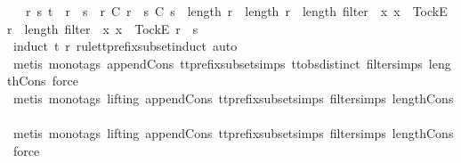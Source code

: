 \begin{isabellebody}
\ \ {\isasymexists}\ r{\isacharprime}\ s{\isacharprime}{\isachardot}\ t\ {\isacharequal}\ r{\isacharprime}\ {\isacharat}\ s{\isacharprime}\ {\isasymand}\ r{\isacharprime}\ {\isasymlesssim}\isactrlsub C\ r\ {\isasymand}\ s{\isacharprime}\ {\isasymlesssim}\isactrlsub C\ s\ {\isasymand}\ {\isacharparenleft}{\isacharparenleft}length\ r{\isacharprime}\ {\isacharequal}\ length\ r\ {\isasymand}\ length\ {\isacharparenleft}filter\ {\isacharparenleft}{\isasymlambda}\ x{\isachardot}\ x\ {\isacharequal}\ {\isacharbrackleft}Tock{\isacharbrackright}\isactrlsub E{\isacharparenright}\ r{\isacharprime}{\isacharparenright}\ {\isacharequal}\ length\ {\isacharparenleft}filter\ {\isacharparenleft}{\isasymlambda}\ x{\isachardot}\ x\ {\isacharequal}\ {\isacharbrackleft}Tock{\isacharbrackright}\isactrlsub E{\isacharparenright}\ r{\isacharparenright}{\isacharparenright}\ {\isasymor}\ s{\isacharprime}\ {\isacharequal}\ {\isacharbrackleft}{\isacharbrackright}{\isacharparenright}{\isachardoublequoteclose}\isanewline
%
\isadelimproof
\ \ %
\endisadelimproof
%
\isatagproof
{}\isamarkupfalse%
\ {\isacharparenleft}induct\ t\ {\isachardoublequoteopen}r{\isachardoublequoteclose}\ rule{\isacharcolon}tt{\isacharunderscore}prefix{\isacharunderscore}subset{\isachardot}induct{\isacharcomma}\ auto{\isacharparenright}\isanewline
\ \ \isamarkupfalse%
\ {\isacharparenleft}metis\ {\isacharparenleft}mono{\isacharunderscore}tags{\isacharparenright}\ append{\isacharunderscore}Cons\ tt{\isacharunderscore}prefix{\isacharunderscore}subset{\isachardot}simps{\isacharparenleft}{}{\isacharparenright}\ ttobs{\isachardot}distinct{\isacharparenleft}{}{\isacharparenright}\ filter{\isachardot}simps{\isacharparenleft}{}{\isacharparenright}\ length{\isacharunderscore}Cons{\isacharcomma}\ force{\isacharparenright}\isanewline
\ \ \isamarkupfalse%
\ {\isacharparenleft}metis\ {\isacharparenleft}mono{\isacharunderscore}tags{\isacharcomma}\ lifting{\isacharparenright}\ append{\isacharunderscore}Cons\ tt{\isacharunderscore}prefix{\isacharunderscore}subset{\isachardot}simps{\isacharparenleft}{}{\isacharparenright}\ filter{\isachardot}simps{\isacharparenleft}{}{\isacharparenright}\ length{\isacharunderscore}Cons{\isacharparenright}\isanewline
\ \ \isamarkupfalse%
\ {\isacharparenleft}metis\ {\isacharparenleft}mono{\isacharunderscore}tags{\isacharcomma}\ lifting{\isacharparenright}\ append{\isacharunderscore}Cons\ tt{\isacharunderscore}prefix{\isacharunderscore}subset{\isachardot}simps{\isacharparenleft}{}{\isacharparenright}\ filter{\isachardot}simps{\isacharparenleft}{}{\isacharparenright}\ length{\isacharunderscore}Cons{\isacharcomma}\ force{\isacharplus}{\isacharparenright}\isanewline

\end{isabellebody}
